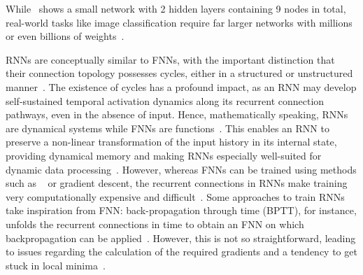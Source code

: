While~ shows a small network with 2 hidden layers containing 9 nodes in total, real-world tasks like image classification require far larger networks with millions or even billions of weights~\cite{ImageNet,BLOOM_CarbonFootprint_176Bparam,GPT-J-6B}. \par
RNNs are conceptually similar to FNNs, with the important distinction that their connection topology possesses cycles, either in a structured or unstructured manner~\cite{lukovsevivcius2009reservoir,Hopfield1982}.
The existence of cycles has a profound impact, as an RNN may develop self-sustained temporal activation dynamics along its recurrent connection pathways, even in the absence of input.
Hence, mathematically speaking, RNNs are dynamical systems while FNNs are functions~\cite{lukovsevivcius2009reservoir}. %
This enables an RNN to preserve a non-linear transformation of the input history in its internal state, providing dynamical memory and making RNNs especially well-suited for dynamic data processing~\cite{RC_RecentAdvances,ApproximationRNN}.
However, whereas FNNs can be trained using methods such as ~\cite{Backpropagation} or gradient descent, the recurrent connections in RNNs make training very computationally expensive and difficult~\cite{DifficultyTrainingRNN,EvaluatingRestrictedESNs,Moon_2021,RC_SuperconductingElectronics,funahashi1992neural}.
Some approaches to train RNNs take inspiration from FNN: back-propagation through time (BPTT), for instance, unfolds the recurrent connections in time to obtain an FNN on which backpropagation can be applied~\cite{jaeger2002tutorial}.
However, this is not so straightforward, leading to issues regarding the calculation of the required gradients and a tendency to get stuck in local minima~\cite{RC_Tensegrity,DifficultyTrainingRNN,D-ESN-Improved}. %

\vspace{-1em}
\vspace{-1em}

